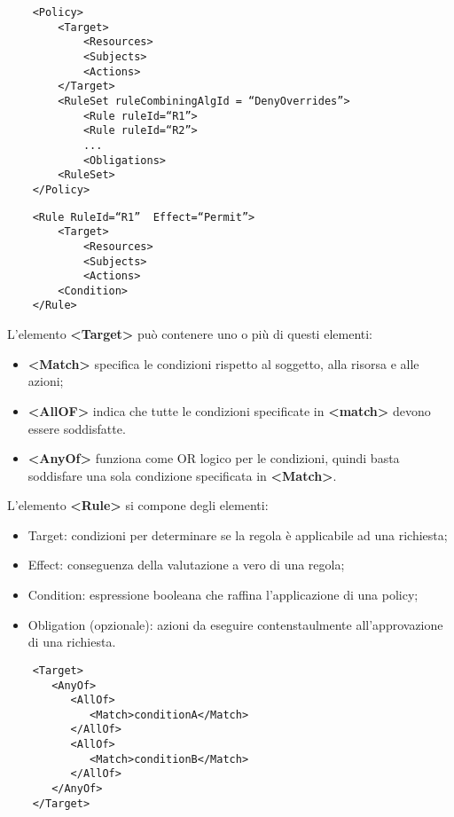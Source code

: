 \begin{lstlisting}
    <Policy>  
    	<Target>  
    		<Resources>  
    		<Subjects>  
    		<Actions>  
    	</Target>  
    	<RuleSet ruleCombiningAlgId = “DenyOverrides”>  
    		<Rule ruleId=“R1”>  
    		<Rule ruleId=“R2”>  
    		...  
    		<Obligations>  
    	<RuleSet>  
    </Policy>
\end{lstlisting}

\begin{lstlisting}
    <Rule RuleId=“R1”  Effect=“Permit”>  
    	<Target>  
    		<Resources>  
    		<Subjects>  
    		<Actions>  
    	<Condition>  
    </Rule> 
\end{lstlisting}

\noindent L'elemento \textbf{<Target>} può contenere uno o più di questi elementi:
\begin{itemize}
    \item \textbf{<Match>} specifica le condizioni rispetto al soggetto, alla risorsa e alle azioni;
    \item \textbf{<AllOF>} indica che tutte le condizioni specificate in \textbf{<match>} devono essere soddisfatte.
    \item \textbf{<AnyOf>} funziona come OR logico per le condizioni, quindi basta soddisfare una sola condizione specificata in \textbf{<Match>}.
\end{itemize}

\noindent L'elemento \textbf{<Rule>} si compone degli elementi:
\begin{itemize}
    \item Target: condizioni per determinare se la regola è applicabile ad una richiesta;
    \item Effect: conseguenza della valutazione a vero di una regola;
    \item Condition: espressione booleana che raffina l'applicazione di una policy;
    \item Obligation (opzionale): azioni da eseguire contenstaulmente all'approvazione di una richiesta.
\end{itemize}

\begin{lstlisting}
    <Target>  
       <AnyOf>  
          <AllOf>  
             <Match>conditionA</Match>  
          </AllOf>  
          <AllOf>  
             <Match>conditionB</Match>  
          </AllOf>  
       </AnyOf>  
    </Target>
\end{lstlisting}


